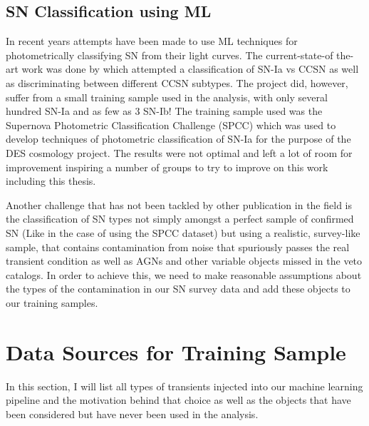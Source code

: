 \subsection{SN Classification using ML}
In recent years attempts have been made to use ML techniques for photometrically classifying SN from their light curves. The current-state-of the-art work was done by \citet{Lochner2016} which attempted a classification of SN-Ia vs CCSN as well as discriminating between different CCSN subtypes. The project did, however, suffer from a small training sample used in the analysis, with only several hundred SN-Ia and as few as 3 SN-Ib! The training sample used was the Supernova Photometric Classification Challenge (SPCC) \citep{Kessler2010} which was used to develop techniques of photometric classification of SN-Ia for the purpose of the DES cosmology project. The results were not optimal and left a lot of room for improvement inspiring a number of groups to try to improve on this work including this thesis.

Another challenge that has not been tackled by other publication in the field is the classification of SN types not simply amongst a perfect sample of confirmed SN (Like in the case of using the SPCC dataset) but using a realistic, survey-like sample, that contains contamination from noise that spuriously passes the real transient condition as well as AGNs and other variable objects missed in the veto catalogs. In order to achieve this, we need to make reasonable assumptions about the types of the contamination in our SN survey data and add these objects to our training samples.

\section{Data Sources for Training Sample}
In this section, I will list all types of transients injected into our machine learning pipeline and the motivation behind that choice as well as the objects that have been considered but have never been used in the analysis.

